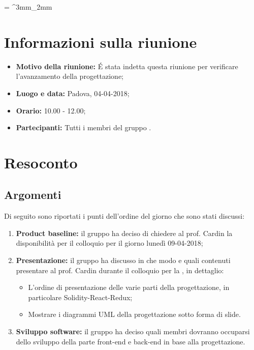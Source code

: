 \documentclass[VER-2018-04-04.tex]{subfiles}
\begin{document}
\tabulinesep = ^3mm_2mm
\chapter{Informazioni sulla riunione}
\begin{itemize}
	\item \textbf{Motivo della riunione:} \'E stata indetta questa riunione per verificare l'avanzamento della progettazione;
	\item \textbf{Luogo e data:} Padova, 04-04-2018;
	\item \textbf{Orario:} 10.00 - 12.00;
	\item \textbf{Partecipanti:} Tutti i membri del gruppo \gruppo.
\end{itemize}



\chapter{Resoconto}
\section{Argomenti}
Di seguito sono riportati i punti dell'ordine del giorno che sono stati discussi:
\begin{enumerate}
	\item \textbf{Product baseline:} il gruppo ha deciso di chiedere al prof. Cardin la disponibilità per il colloquio per il giorno lunedì 09-04-2018;
	\item \textbf{Presentazione:} il gruppo ha discusso in che modo e quali contenuti presentare al prof. Cardin durante il colloquio per la \pb, in dettaglio: 
	\begin{itemize}
		\item L'ordine di presentazione delle varie parti della progettazione, in particolare Solidity-React-Redux;
		\item Mostrare i diagrammi UML della progettazione sotto forma di slide.
	\end{itemize}
\item \textbf{Sviluppo software:} il gruppo ha deciso quali membri dovranno occuparsi dello sviluppo della parte front-end e back-end in base alla progettazione.
\end{enumerate}
\end{document}
